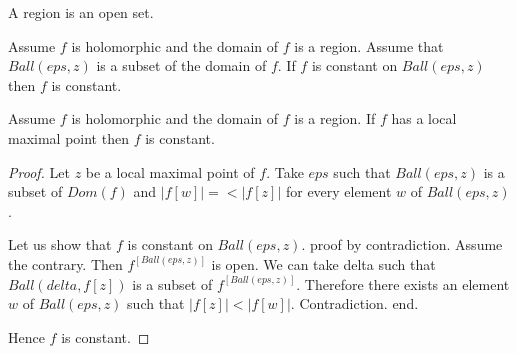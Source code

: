 \documentclass{document}
\begin{document}
\begin{forthel}
    \begin{signature}
      A region is an open set.
    \end{signature}

    \begin{axiom}
      Assume $f$ is holomorphic and the domain of $f$ is a region. Assume that $Ball(eps,z)$ is a subset of the domain of $f$. If $f$ is constant on $Ball(eps,z)$ then $f$ is constant.
    \end{axiom}

    \begin{proposition}
      Assume $f$ is holomorphic and the domain of $f$ is a region. If $f$ has a local maximal point then $f$ is constant.
    \end{proposition}
    \begin{proof}
      Let $z$ be a local maximal point of $f$. Take $eps$ such that $Ball(eps,z)$ is a subset of $Dom(f)$ and $|f[w]| =< |f[z]|$ for every element $w$ of $Ball(eps,z)$.

      Let us show that $f$ is constant on $Ball(eps,z)$.
      proof by contradiction.
        Assume the contrary. Then $f^[Ball(eps,z)]$ is open. We can take delta such that $Ball(delta, f[z])$ is a subset of $f^[Ball(eps,z)]$. Therefore there exists an element $w$ of $Ball(eps,z)$ such that $|f[z]| < |f[w]|$. Contradiction.
    	end.

      Hence $f$ is constant.
    \end{proof}
  \end{forthel}
\end{document}
